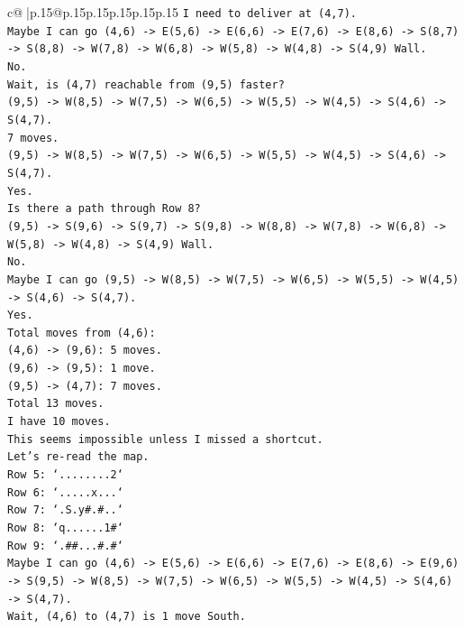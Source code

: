 \documentclass{article}
\begin{document}
{\begin{supertabular}{c@{$\;$}|p{.15\linewidth}@{}p{.15\linewidth}p{.15\linewidth}p{.15\linewidth}p{.15\linewidth}p{.15\linewidth}}
{{{\texttt{I need to deliver at (4,7).} \\
\texttt{Maybe I can go (4,6) {-}> E(5,6) {-}> E(6,6) {-}> E(7,6) {-}> E(8,6) {-}> S(8,7) {-}> S(8,8) {-}> W(7,8) {-}> W(6,8) {-}> W(5,8) {-}> W(4,8) {-}> S(4,9) Wall.} \\
\texttt{No.} \\
\texttt{Wait, is (4,7) reachable from (9,5) faster?} \\
\texttt{(9,5) {-}> W(8,5) {-}> W(7,5) {-}> W(6,5) {-}> W(5,5) {-}> W(4,5) {-}> S(4,6) {-}> S(4,7).} \\
\texttt{7 moves.} \\
\texttt{(9,5) {-}> W(8,5) {-}> W(7,5) {-}> W(6,5) {-}> W(5,5) {-}> W(4,5) {-}> S(4,6) {-}> S(4,7).} \\
\texttt{Yes.} \\
\texttt{Is there a path through Row 8?} \\
\texttt{(9,5) {-}> S(9,6) {-}> S(9,7) {-}> S(9,8) {-}> W(8,8) {-}> W(7,8) {-}> W(6,8) {-}> W(5,8) {-}> W(4,8) {-}> S(4,9) Wall.} \\
\texttt{No.} \\
\texttt{Maybe I can go (9,5) {-}> W(8,5) {-}> W(7,5) {-}> W(6,5) {-}> W(5,5) {-}> W(4,5) {-}> S(4,6) {-}> S(4,7).} \\
\texttt{Yes.} \\
\texttt{Total moves from (4,6):} \\
\texttt{(4,6) {-}> (9,6): 5 moves.} \\
\texttt{(9,6) {-}> (9,5): 1 move.} \\
\texttt{(9,5) {-}> (4,7): 7 moves.} \\
\texttt{Total 13 moves.} \\
\texttt{I have 10 moves.} \\
\texttt{This seems impossible unless I missed a shortcut.} \\
\texttt{Let's re{-}read the map.} \\
\texttt{Row 5: `........2`} \\
\texttt{Row 6: `.....x...`} \\
\texttt{Row 7: `.S.y\#.\#..`} \\
\texttt{Row 8: `q......1\#`} \\
\texttt{Row 9: `.\#\#...\#.\#`} \\
\texttt{Maybe I can go (4,6) {-}> E(5,6) {-}> E(6,6) {-}> E(7,6) {-}> E(8,6) {-}> E(9,6) {-}> S(9,5) {-}> W(8,5) {-}> W(7,5) {-}> W(6,5) {-}> W(5,5) {-}> W(4,5) {-}> S(4,6) {-}> S(4,7).} \\
\texttt{Wait, (4,6) to (4,7) is 1 move South.} \\
}}}
\end{supertabular}}
\end{document}
